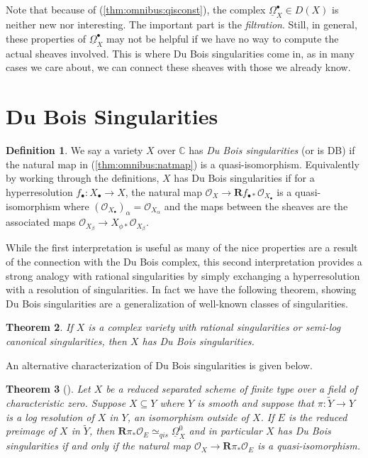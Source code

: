 \documentclass{report}
\newtheorem{theorem}{Theorem}[section]
\theoremstyle{definition}
\newtheorem{definition}[theorem]{Definition}
\newcommand{\CC}{\mathbb{C}}
\newcommand{\OO}{\mathcal{O}}
\newcommand{\qis}{\simeq_{qis}}
\newcommand{\bR}{\textbf{R}}
\newcommand{\DB}{\underline{\Omega}}
\begin{document}
Note that because of (\ref{thm:omnibus:qisconst}), the complex $\DB_X^\bullet \in D(X)$ is neither new nor interesting.
The important part is the {\it filtration}.
Still, in general, these properties of $\DB_X^\bullet$ may not be helpful if we have no way to compute the actual sheaves involved.
This is where Du Bois singularities come in, as in many cases we care about, we can connect these sheaves with those we already know.

\section{Du Bois Singularities}

\begin{definition}
	\label{def:dubois}
	We say a variety $X$ over $\CC$ has {\it Du Bois singularities} (or is DB) if the natural map in (\ref{thm:omnibus:natmap}) is a quasi-isomorphism.
	Equivalently by working through the definitions, $X$  has Du Bois singularities if for a hyperresolution $f_{\bullet} : X_\bullet \rightarrow X$, the natural map $\OO_X \rightarrow\bR f_{\bullet *} \OO_{X_\bullet}$ is a quasi-isomorphism where $(\OO_{X_\bullet})_\alpha = \OO_{X_\alpha}$ and the maps between the sheaves are the associated maps $\OO_{X_\beta} \rightarrow X_{\phi *} \OO_{X_\beta}$.
\end{definition}

While the first interpretation is useful as many of the nice properties are a result of the connection with the Du Bois complex, this second interpretation provides a strong analogy with rational singularities by simply exchanging a hyperresolution with a resolution of singularities.
In fact we have the following theorem, showing Du Bois singularities are a generalization of well-known classes of singularities.
\begin{theorem}
	If $X$ is a complex variety with rational singularities or semi-log canonical singularities, then $X$ has Du Bois singularities.
\end{theorem}

An alternative characterization of Du Bois singularities is given below.

\begin{theorem}[\cite{Schwede2007}]
	Let $X$ be a reduced separated scheme of finite type over a field of characteristic zero.
	Suppose $X \subseteq Y$ where $Y$ is smooth and suppose that $\pi : \tilde{Y} \rightarrow Y$ is a log resolution of $X$ in $Y$, an isomorphism outside of $X$.
	If $E$ is the reduced preimage of $X$ in $\tilde{Y}$, then $\bR \pi_* \OO_E \qis \DB_X^0$ and in particular $X$ has Du Bois singularities if and only if the natural map $\OO_X \rightarrow \bR \pi_* \OO_E$ is a quasi-isomorphism.
\end{theorem}
\end{document}
